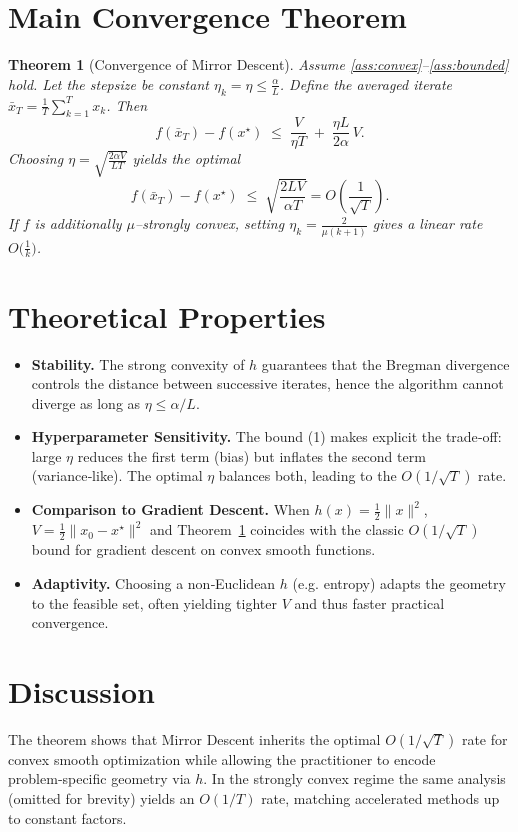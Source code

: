 \documentclass{article}
\newtheorem{theorem}{Theorem}
\begin{document}
\section*{Main Convergence Theorem}
\begin{theorem}[Convergence of Mirror Descent]\label{thm:md}
Assume \ref{ass:convex}–\ref{ass:bounded} hold.
Let the stepsize be constant $\eta_{k}=\eta\le \frac{\alpha}{L}$.
Define the averaged iterate $\bar x_{T}= \frac{1}{T}\sum_{k=1}^{T}x_{k}$.
Then
\[
f(\bar x_{T})-f(x^{\star})
\;\le\;
\frac{V}{\eta T}
\;+\;
\frac{\eta L}{2\alpha}\,V .
\tag{1}
\]
Choosing $\displaystyle\eta=\sqrt{\frac{2\alpha V}{L T}}$ yields the optimal
\[
f(\bar x_{T})-f(x^{\star})\;\le\; \sqrt{\frac{2L V}{\alpha T}}=O\!\left(\frac{1}{\sqrt{T}}\right).
\]
If $f$ is additionally $\mu$–strongly convex, setting $\eta_{k}= \frac{2}{\mu(k+1)}$
gives a linear rate $O\!\bigl(\frac{1}{k}\bigr)$.
\end{theorem}

\section*{Theoretical Properties}
\begin{itemize}
\item \textbf{Stability.} The strong convexity of $h$ guarantees that the Bregman
divergence controls the distance between successive iterates,
hence the algorithm cannot diverge as long as $\eta\le\alpha/L$.
\item \textbf{Hyperparameter Sensitivity.}
The bound (1) makes explicit the trade‑off:
large $\eta$ reduces the first term (bias) but inflates the second term (variance‑like).
The optimal $\eta$ balances both, leading to the $O(1/\sqrt{T})$ rate.
\item \textbf{Comparison to Gradient Descent.}
When $h(x)=\tfrac12\|x\|^{2}$, $V=\tfrac12\|x_{0}-x^{\star}\|^{2}$ and Theorem~\ref{thm:md}
coincides with the classic $O(1/\sqrt{T})$ bound for gradient descent on
convex smooth functions.
\item \textbf{Adaptivity.}
Choosing a non‑Euclidean $h$ (e.g. entropy) adapts the geometry to the feasible set,
often yielding tighter $V$ and thus faster practical convergence.
\end{itemize}

\section*{Discussion}
The theorem shows that Mirror Descent inherits the optimal $O(1/\sqrt{T})$ rate
for convex smooth optimization while allowing the practitioner to encode problem‑specific geometry via $h$.
In the strongly convex regime the same analysis (omitted for brevity) yields an $O(1/T)$ rate,
matching accelerated methods up to constant factors.
\end{document}
